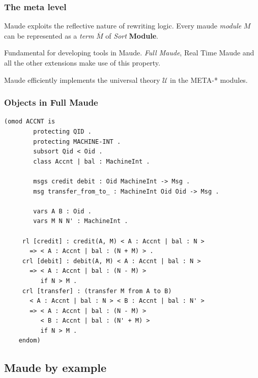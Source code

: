 \documentclass{beamer}
\begin{document}
\begin{frame}
    \frametitle{The meta level }
    Maude exploits the reflective nature of rewriting logic. Every maude \emph{module} \textbf{$M$} can be represented  as 
    a \emph{term} \textbf{$\overline{M}$} of \emph{Sort} \textbf{Module}. 

    \bigskip
    \pause 
    Fundamental for developing tools in Maude. \emph{Full Maude}, Real Time Maude and all the 
    other extensions make use of this property.
    
    \pause
    \bigskip 
    Maude efficiently implements the universal theory $\mathcal{U}$ in the META-* modules.

\end{frame}
\begin{frame}[fragile]
    \scriptsize
    \frametitle{Objects in Full Maude}
    \begin{lstlisting}[language=maude]
    (omod ACCNT is 
        protecting QID .
        protecting MACHINE-INT .
        subsort Qid < Oid .
        class Accnt | bal : MachineInt .  
        
        msgs credit debit : Oid MachineInt -> Msg .  
        msg transfer_from_to_ : MachineInt Oid Oid -> Msg .  

        vars A B : Oid . 
        vars M N N' : MachineInt .  

     rl [credit] : credit(A, M) < A : Accnt | bal : N >
       => < A : Accnt | bal : (N + M) > .  
     crl [debit] : debit(A, M) < A : Accnt | bal : N >
       => < A : Accnt | bal : (N - M) >
          if N > M .  
     crl [transfer] : (transfer M from A to B)
       < A : Accnt | bal : N > < B : Accnt | bal : N' > 
       => < A : Accnt | bal : (N - M) > 
          < B : Accnt | bal : (N' + M) >
          if N > M . 
    endom)
    \end{lstlisting}
\end{frame}
\subsection{Maude by example}
\end{document}
